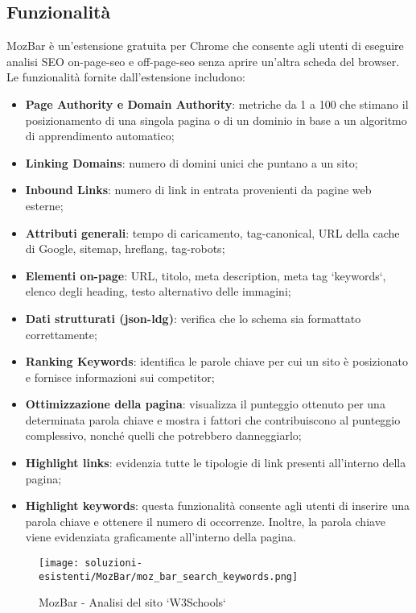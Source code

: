 \subsection{Funzionalità}
\par MozBar è un'estensione gratuita per Chrome che consente agli utenti di eseguire analisi SEO \gls{on-page-seo} e \gls{off-page-seo} senza aprire un'altra scheda del browser. Le funzionalità fornite dall'estensione includono:
\begin{itemize}
    \item \textbf{Page Authority e Domain Authority}: metriche da 1 a 100 che stimano il posizionamento di una singola pagina o di un dominio in base a un algoritmo di apprendimento automatico;
    \item \textbf{Linking Domains}: numero di domini unici che puntano a un sito;
    \item \textbf{Inbound Links}: numero di link in entrata provenienti da pagine web esterne;
    \item \textbf{Attributi generali}: tempo di caricamento, \gls{tag-canonical}, URL della cache di Google, \gls{sitemap}, \gls{hreflang}, \gls{tag-robots};
    \item \textbf{Elementi on-page}: URL, titolo, meta description, meta tag `keywords`, elenco degli heading, testo alternativo delle immagini;
    \item \textbf{Dati strutturati (\gls{json-ldg})}: verifica che lo schema sia formattato correttamente;
    \item \textbf{Ranking Keywords}: identifica le parole chiave per cui un sito è posizionato e fornisce informazioni sui competitor;
    \item \textbf{Ottimizzazione della pagina}: visualizza il punteggio ottenuto per una determinata parola chiave e mostra  i fattori che contribuiscono al punteggio complessivo, nonché quelli che potrebbero danneggiarlo;
    \item \textbf{Highlight links}: evidenzia tutte le tipologie di link presenti all'interno della pagina;
    \item \textbf{Highlight keywords}: questa funzionalità consente agli utenti di inserire una parola chiave e ottenere il numero di occorrenze. Inoltre, la parola chiave viene evidenziata graficamente all'interno della pagina.
\end{itemize}

\begin{figure}[H]
    \centering 
    \texttt{[image: soluzioni-esistenti/MozBar/moz\_bar\_search\_keywords.png]} 
    \caption{MozBar - Analisi del sito `W3Schools`}
\end{figure}

